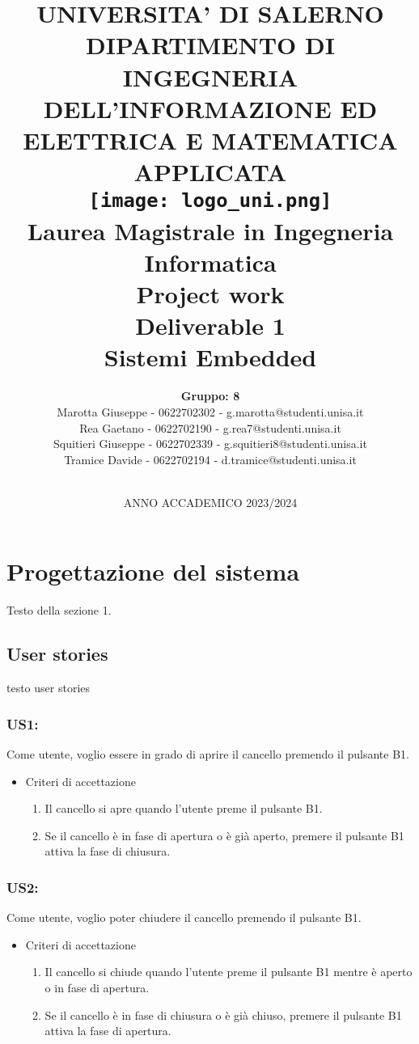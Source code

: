 \documentclass[12pt]{article}
\title{
    \Large \textbf{UNIVERSITA' DI SALERNO} \\[0.5em]
    \small DIPARTIMENTO DI INGEGNERIA DELL'INFORMAZIONE ED ELETTRICA E MATEMATICA APPLICATA\\[5em]
    \texttt{[image: logo\_uni.png]}\\[3em] %
    \normalsize Laurea Magistrale in Ingegneria Informatica \\[1em]
    \Large \textbf {Project work} \\[1em]
    \large \textbf {Deliverable 1} \\ [1em]
    \large {Sistemi Embedded} \\[1em]
}
\author{
    \textbf{Gruppo: 8} \\
    \normalsize Marotta Giuseppe - 0622702302 - g.marotta@studenti.unisa.it\\
    \normalsize Rea Gaetano - 0622702190 - g.rea7@studenti.unisa.it\\
    \normalsize Squitieri Giuseppe - 0622702339 - g.squitieri8@studenti.unisa.it\\ 
    \normalsize Tramice Davide - 0622702194 - d.tramice@studenti.unisa.it\\ \\
    }
\date{
    ANNO ACCADEMICO 2023/2024 %
}
\begin{document}
\begin{titlingpage} %
\maketitle
\thispagestyle{empty} %
\end{titlingpage}

\newpage

\tableofcontents

\newpage

\section{Progettazione del sistema}
Testo della sezione 1.
\subsection{User stories}
testo user stories
\subsubsection{US1:}
Come utente, voglio essere in grado di aprire il cancello premendo il pulsante B1.
\begin{itemize}
    \item Criteri di accettazione
    \begin{enumerate}
        \item Il cancello si apre quando l'utente preme il pulsante B1.
        \item Se il cancello è in fase di apertura o è già aperto, premere il pulsante B1 attiva la fase di chiusura.
    \end{enumerate}
\end{itemize}
\subsubsection{US2:}
Come utente, voglio poter chiudere il cancello premendo il pulsante B1.
\begin{itemize}
    \item Criteri di accettazione
    \begin{enumerate}
        \item Il cancello si chiude quando l'utente preme il pulsante B1 mentre è aperto o in fase di apertura.
        \item Se il cancello è in fase di chiusura o è già chiuso, premere il pulsante B1 attiva la fase di apertura.
    \end{enumerate}
\end{itemize}
\end{document}
